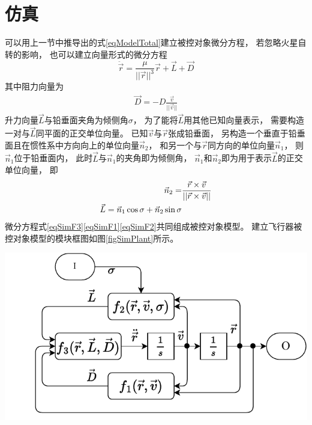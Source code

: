 \section{仿真}
可以用上一节中推导出的式\eqref{eqModelTotal}建立被控对象微分方程，
若忽略火星自转的影响，
也可以建立向量形式的微分方程
\begin{equation}
    \ddot{\vec{r}} = \frac{\mu}{||\vec{r}||^3}\vec{r}+\vec{L}+\vec{D} \label{eqSimF3}
\end{equation}
其中阻力向量为
\begin{align}
    \vec{D} = -D\frac{\vec{v}}{||\vec{v}||} \label{eqSimF1}
\end{align}
升力向量$\vec{L}$与铅垂面夹角为倾侧角$\sigma$，
为了能将$\vec{L}$用其他已知向量表示，
需要构造一对与$\vec{L}$同平面的正交单位向量。
已知$\vec{v}$与$\vec{r}$张成铅垂面，
另构造一个垂直于铅垂面且在惯性系中方向向上的单位向量$\vec{n}_2$，
和另一个与$\vec{r}$同方向的单位向量$\vec{n}_1$，
则$\vec{n}_1$位于铅垂面内，
此时$\vec{L}$与$\vec{n}_1$的夹角即为倾侧角，
$\vec{n}_1$和$\vec{n}_2$即为用于表示$\vec{L}$的正交单位向量，
即
\begin{align}
    \vec{n}_2 =& \frac{\vec{r}\times\vec{v}}{||\vec{r}\times\vec{v}||} \notag\\
    \vec{L}=\vec{n}_1\cos\sigma + \vec{n}_2\sin\sigma \label{eqSimF2}
\end{align}
微分方程式\eqref{eqSimF3}\eqref{eqSimF1}\eqref{eqSimF2}共同组成被控对象模型。
建立飞行器被控对象模型的模块框图如图\ref{figSimPlant}所示。
\begin{center}
	\includegraphics[scale=0.8]{plant.pdf}  \\
	\label{figSimPlant}
\end{center}
